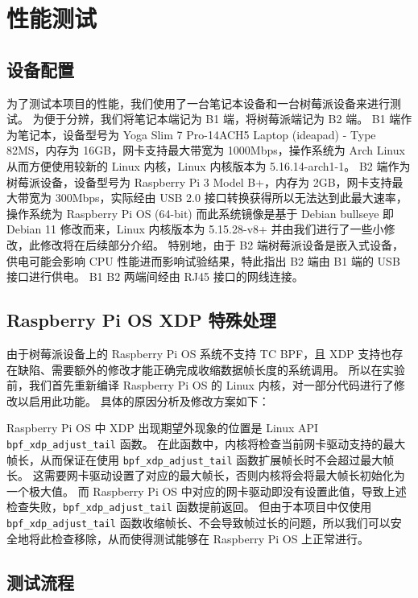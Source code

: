 \section{性能测试}

\subsection{设备配置}

为了测试本项目的性能，我们使用了一台笔记本设备和一台树莓派设备来进行测试。
为便于分辨，我们将笔记本端记为 B1 端，将树莓派端记为 B2 端。
B1 端作为笔记本，设备型号为 Yoga Slim 7 Pro-14ACH5 Laptop (ideapad) - Type 82MS，内存为 16GB，网卡支持最大带宽为 1000Mbps，操作系统为 Arch Linux 从而方便使用较新的 Linux 内核，Linux 内核版本为 5.16.14-arch1-1。
B2 端作为树莓派设备，设备型号为 Raspberry Pi 3 Model B+，内存为 2GB，网卡支持最大带宽为 300Mbps，实际经由 USB 2.0 接口转换获得所以无法达到此最大速率，操作系统为 Raspberry Pi OS (64-bit) 而此系统镜像是基于 Debian bullseye 即 Debian 11 修改而来，Linux 内核版本为 5.15.28-v8+ 并由我们进行了一些小修改，此修改将在后续部分介绍。
特别地，由于 B2 端树莓派设备是嵌入式设备，供电可能会影响 CPU 性能进而影响试验结果，特此指出 B2 端由 B1 端的 USB 接口进行供电。
B1 B2 两端间经由 RJ45 接口的网线连接。

\subsection{Raspberry Pi OS XDP 特殊处理}

由于树莓派设备上的 Raspberry Pi OS 系统不支持 TC BPF，且 XDP 支持也存在缺陷、需要额外的修改才能正确完成收缩数据帧长度的系统调用。
所以在实验前，我们首先重新编译 Raspberry Pi OS 的 Linux 内核，对一部分代码进行了修改以启用此功能。
具体的原因分析及修改方案如下：

Raspberry Pi OS 中 XDP 出现期望外现象的位置是 Linux API \texttt{bpf\_xdp\_adjust\_tail} 函数。
在此函数中，内核将检查当前网卡驱动支持的最大帧长，从而保证在使用 \texttt{bpf\_xdp\_adjust\_tail} 函数扩展帧长时不会超过最大帧长。
这需要网卡驱动设置了对应的最大帧长，否则内核将会将最大帧长初始化为一个极大值。
而 Raspberry Pi OS 中对应的网卡驱动即没有设置此值，导致上述检查失败，\texttt{bpf\_xdp\_adjust\_tail} 函数提前返回。
但由于本项目中仅使用 \texttt{bpf\_xdp\_adjust\_tail} 函数收缩帧长、不会导致帧过长的问题，所以我们可以安全地将此检查移除，从而使得测试能够在 Raspberry Pi OS 上正常进行。

\subsection{测试流程}

